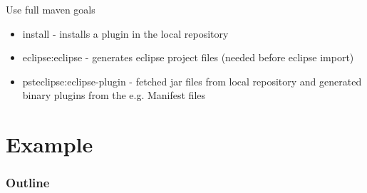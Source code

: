 \note
{
\begin{block}{Use full maven goals}
\begin{itemize}
	\item install - installs a plugin in the local repository
	\item eclipse:eclipse - generates eclipse project files (needed before eclipse import)
	\item psteclipse:eclipse-plugin - fetched jar files from local repository and generated binary plugins from the e.g. Manifest files
\end{itemize}
\end{block}
}

\section{Example}
%
%
\begin{frame}
  \frametitle{Outline}
  \tableofcontents[current]
\end{frame}



